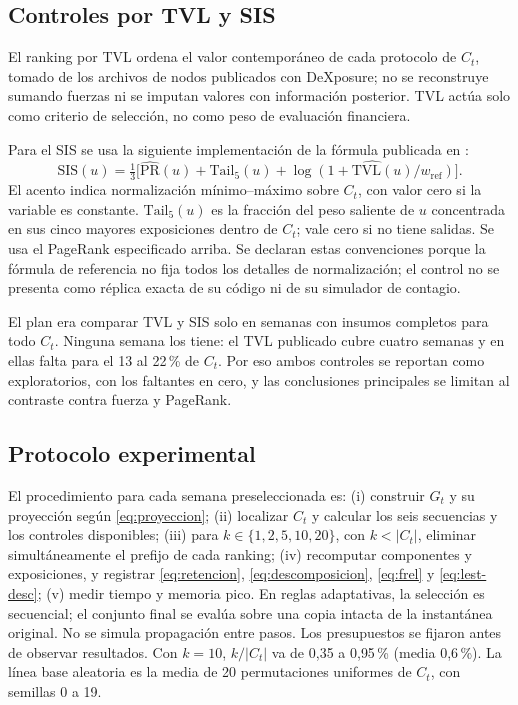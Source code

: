 \documentclass[journal]{IEEEtran}
\begin{document}
\subsection{Controles por TVL y SIS}

El ranking por TVL ordena el valor contemporáneo de cada protocolo de $C_t$,
tomado de los archivos de nodos publicados con DeXposure; no se reconstruye
sumando fuerzas ni se imputan valores con información posterior. TVL actúa
solo como criterio de selección, no como peso de evaluación financiera.

Para el SIS se usa la siguiente implementación de la fórmula publicada
en \cite{shu2026dexposurefm}:
\begin{equation}
\mathrm{SIS}(u)=\tfrac13\bigl[\widehat{\mathrm{PR}}(u)
+\mathrm{Tail}_5(u)+\widehat{\log(1+\mathrm{TVL}(u)/w_{\mathrm{ref}})}\bigr].
\label{eq:sis}
\end{equation}
El acento indica normalización mínimo--máximo sobre $C_t$, con valor cero
si la variable es constante. $\mathrm{Tail}_5(u)$ es la fracción del peso
saliente de $u$ concentrada en sus cinco mayores exposiciones dentro de $C_t$;
vale cero si no tiene salidas. Se usa el PageRank especificado arriba. Se
declaran estas convenciones porque la fórmula de referencia no fija todos los
detalles de normalización; el control no se presenta como réplica exacta de
su código ni de su simulador de contagio.

El plan era comparar TVL y SIS solo en semanas con insumos completos para todo
$C_t$. Ninguna semana los tiene: el TVL publicado cubre cuatro semanas y en
ellas falta para el 13 al 22\,\% de $C_t$. Por eso ambos controles se reportan
como exploratorios, con los faltantes en cero, y las conclusiones principales
se limitan al contraste contra fuerza y PageRank.

\subsection{Protocolo experimental}

El procedimiento para cada semana preseleccionada es: (i) construir $G_t$ y
su proyección según \eqref{eq:proyeccion}; (ii) localizar $C_t$ y calcular los
seis secuencias y los controles disponibles; (iii) para $k\in\{1,2,5,10,20\}$,
con $k<|C_t|$, eliminar simultáneamente
el prefijo de cada ranking; (iv) recomputar componentes y exposiciones, y
registrar \eqref{eq:retencion}, \eqref{eq:descomposicion}, \eqref{eq:frel} y
\eqref{eq:lest-desc}; (v) medir tiempo y memoria pico. En reglas adaptativas,
la selección es secuencial; el conjunto final se evalúa sobre una copia intacta
de la instantánea original. No se simula propagación entre pasos. Los
presupuestos se fijaron antes de observar resultados. Con $k=10$,
$k/|C_t|$ va de 0{,}35 a 0{,}95\,\% (media 0{,}6\,\%). La línea base aleatoria
es la media de 20 permutaciones uniformes de $C_t$, con semillas 0 a 19.
\end{document}
